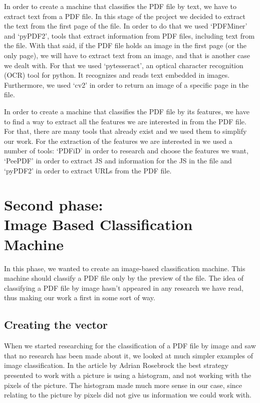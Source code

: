 \documentclass{article}
\begin{document}
\indent In order to create a machine that classifies the PDF file by text, we have to extract text from a PDF file. In this stage of the project we decided to extract the text from the first page of the file. In order to do that we used ‘PDFMiner’ and ‘pyPDF2’, tools that extract information from PDF files, including text from the file. With that said, if the PDF file holds an image in the first page (or the only page), we will have to extract text from an image, and that is another case we dealt with. For that we used ‘pytesseract’, an optical character recognition (OCR) tool for python. It recognizes and reads text embedded in images. Furthermore, we used ‘cv2’ in order to return an image of a specific page in the file.

\indent In order to create a machine that classifies the PDF file by its features, we have to find a way to extract all the features we are interested in from the PDF file. For that, there are many tools that already exist and we used them to simplify our work. For the extraction of the features we are interested in we used a number of tools: ‘PDFiD’ in order to research and choose the features we want, ‘PeePDF’ in order to extract JS and information for the JS in the file and ‘pyPDF2’ in order to extract URLs from the PDF file.

\section[Second phase: Image Based Classification Machine]{Second phase: \\ Image Based Classification Machine}
\indent In this phase, we wanted to create an image-based classification machine. This machine should classify a PDF file only by the preview of the file. The idea of classifying a PDF file by image hasn't appeared in any research we have read, thus making our work a first in some sort of way.

\subsection{Creating the vector}
\indent When we started researching for the classification of a PDF file by image and saw that no research has been made about it, we looked at much simpler examples of image classification. In the article by Adrian Rosebrock \cite{HistogramImage} the best strategy presented to work with a picture is using a histogram, and not working with the pixels of the picture. The histogram made much more sense in our case, since relating to the picture by pixels did not give us information we could work with.
\end{document}
